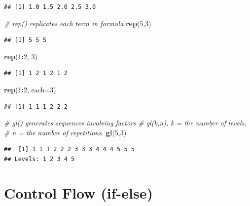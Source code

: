 \documentclass[]{book}
\newenvironment{Shaded}{\begin{snugshade}}{\end{snugshade}}
\newcommand{\CommentTok}[1]{\textcolor[rgb]{0.56,0.35,0.01}{\textit{#1}}}
\newcommand{\DataTypeTok}[1]{\textcolor[rgb]{0.13,0.29,0.53}{#1}}
\newcommand{\DecValTok}[1]{\textcolor[rgb]{0.00,0.00,0.81}{#1}}
\newcommand{\KeywordTok}[1]{\textcolor[rgb]{0.13,0.29,0.53}{\textbf{#1}}}
\newcommand{\NormalTok}[1]{#1}
\newcommand{\OperatorTok}[1]{\textcolor[rgb]{0.81,0.36,0.00}{\textbf{#1}}}
\begin{document}
\begin{verbatim}
## [1] 1.0 1.5 2.0 2.5 3.0
\end{verbatim}

\begin{Shaded}
\begin{Highlighting}[]
\CommentTok{# rep() replicates each term in formula}
\KeywordTok{rep}\NormalTok{(}\DecValTok{5}\NormalTok{,}\DecValTok{3}\NormalTok{)}
\end{Highlighting}
\end{Shaded}

\begin{verbatim}
## [1] 5 5 5
\end{verbatim}

\begin{Shaded}
\begin{Highlighting}[]
\KeywordTok{rep}\NormalTok{(}\DecValTok{1}\OperatorTok{:}\DecValTok{2}\NormalTok{, }\DecValTok{3}\NormalTok{)}
\end{Highlighting}
\end{Shaded}

\begin{verbatim}
## [1] 1 2 1 2 1 2
\end{verbatim}

\begin{Shaded}
\begin{Highlighting}[]
\KeywordTok{rep}\NormalTok{(}\DecValTok{1}\OperatorTok{:}\DecValTok{2}\NormalTok{, }\DataTypeTok{each=}\DecValTok{3}\NormalTok{)}
\end{Highlighting}
\end{Shaded}

\begin{verbatim}
## [1] 1 1 1 2 2 2
\end{verbatim}

\begin{Shaded}
\begin{Highlighting}[]
\CommentTok{# gl() generates sequences involving factors}
\CommentTok{# gl(k,n), k = the number of levels, }
\CommentTok{# n = the number of repetitions.}
\KeywordTok{gl}\NormalTok{(}\DecValTok{5}\NormalTok{,}\DecValTok{3}\NormalTok{)}
\end{Highlighting}
\end{Shaded}

\begin{verbatim}
##  [1] 1 1 1 2 2 2 3 3 3 4 4 4 5 5 5
## Levels: 1 2 3 4 5
\end{verbatim}

\hypertarget{control-flow-if-else}{%
\section{Control Flow (if-else)}\label{control-flow-if-else}}
\end{document}
